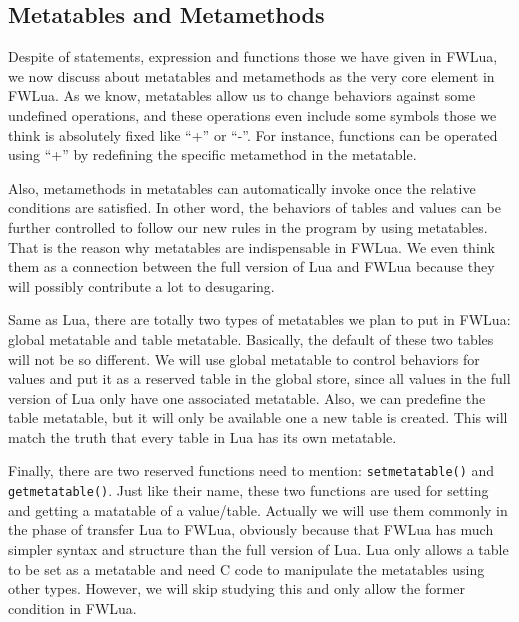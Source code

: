 \documentclass{article}
\begin{document}
\newcommand{\abFunction}[2]{{\tt function} ~{#1}~{\tt return}~{#2}~{\tt end}}
\newcommand{\semanticFullRaw}[4]{{#1},{#2} \Downarrow {#3},{#4}}
\newcommand{\semanticFull}[4]{{#1},{#2} \Downarrow {#3}, {#4}}


\subsection{Metatables and Metamethods}
Despite of statements, expression and functions those we have given in FWLua, we now discuss about metatables and metamethods as the very core element in FWLua. As we know, metatables allow us to change behaviors against some undefined operations, and these operations even include some symbols those we think is absolutely fixed like ``+'' or ``-''. For instance, functions can be operated using ``+'' by redefining the specific metamethod in the metatable. 

Also, metamethods in metatables can automatically invoke once the relative conditions are satisfied. In other word, the behaviors of tables and values can be further controlled to follow our new rules in the program by using metatables. That is the reason why metatables are indispensable in FWLua. We even think them as a connection between the full version of Lua and FWLua because they will possibly contribute a lot to desugaring.

Same as Lua, there are totally two types of metatables we plan to put in FWLua: global metatable and table metatable. Basically, the default of these two tables will not be so different. We will use global metatable to control behaviors for values and put it as a reserved table in the global store, since all values in the full version of Lua only have one associated metatable. Also, we can predefine the table metatable, but it will only be available one a new table is created. This will match the truth that every table in Lua has its own metatable.

Finally, there are two reserved functions need to mention: {\tt setmetatable()} and {\tt getmetatable()}. Just like their name, these two functions are used for setting and getting a matatable of a value/table. Actually we will use them commonly in the phase of transfer Lua to FWLua, obviously because that FWLua has much simpler syntax and structure than the full version of Lua. Lua only allows a table to be set as a metatable and need C code to manipulate the metatables using other types. However, we will skip studying this and only allow the former condition in FWLua.
\end{document}
